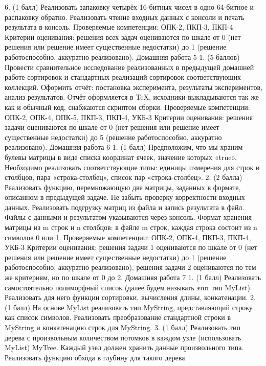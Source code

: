     6. (1 балл) Реализовать запаковку четырёх 16-битных чисел в одно 64-битное и распаковку обратно. Реализовать чтение входных данных с консоли и печать результата в консоль.
Проверяемые компетенции: ОПК-2, ПКП-3, ПКП-4
Критерии оценивания: решения всех задач оцениваются по шкале от 0 (нет решения или решение имеет существенные недостатки) до 1 (решение работоспособно, аккуратно реализовано). 
Домашняя работа 5
    1. (5 баллов) Провести сравнительное исследование реализованных в предыдущей домашней работе сортировок и стандартных реализаций сортировок соответствующих коллекций. Оформить отчёт: постановка эксперимента, результаты экспериментов, анализ результатов. Отчёт оформляется в TeX, исходники выкладываются так же как и обычный код, снабжаются скриптом сборки.
Проверяемые компетенции: ОПК-2, ОПК-4, ОПК-5, ПКП-3, ПКП-4, УКБ-3
Критерии оценивания: решения задачи оцениваются по шкале от 0 (нет решения или решение имеет существенные недостатки) до 5 (решение работоспособно, аккуратно реализовано). 
Домашняя работа 6
    1. (1 балл) Предположим, что мы храним булевы матрицы в виде списка координат ячеек, значение которых «true». Необходимо реализовать соответствующие типы: единицы измерения для строк и столбцов, пара «строка-столбец», список пар «строка-столбец». 
    2. (2 балла) Реализовать функцию, перемножающую две матрицы, заданных в формате, описанном в предыдущей задаче. Не забыть проверку корректности входных данных. Реализовать подгрузку матриц из файла и запись результата в файл. Файлы с данными и результатом указываются через консоль. Формат хранения матрицы из m строк и n столбцов: в файле m строк, каждая строка состоит из n символов 0 или 1. 
Проверяемые компетенции: ОПК-2, ОПК-4, ПКП-3, ПКП-4, УКБ-3
Критерии оценивания: решения задачи 1 оцениваются по шкале от 0 (нет решения или решение имеет существенные недостатки) до 1 (решение работоспособно, аккуратно реализовано), решения задачи 2 оцениваются по тем же критериям, но по шкале от 0 до 2.
Домашняя работа 7 
    1. (1 балл) Реализовать самостоятельно полиморфный список (далее будем называть этот тип MyList). Реализовать для него функции сортировки, вычисления длины, конкатенации.
    2. (1 балл) На основе MyList реализовать тип MyString, представляющий строку как список символов. Реализовать преобразование стандартной строки в MyString и конкатенацию строк для  MyString.
    3. (1 балл) Реализовать тип дерева с произвольным количеством потомков в каждом узле (использовать MyList) MyTree. Каждый узел должен хранить данные произвольного типа. Реализовать функцию обхода в глубину для такого дерева.
